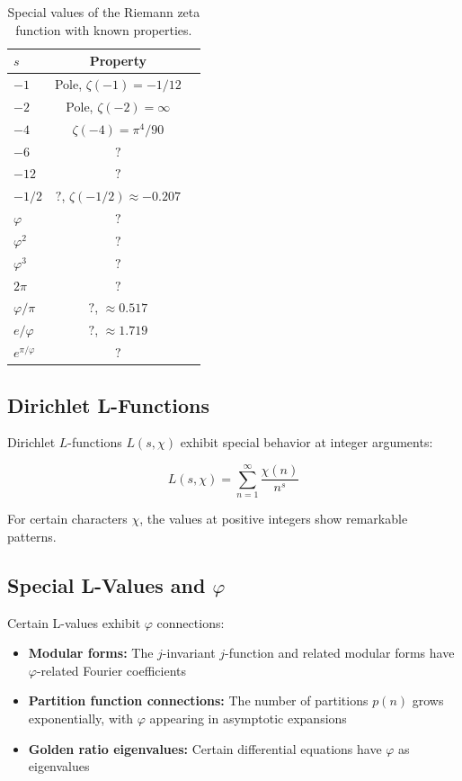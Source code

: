 \documentclass{article}
\begin{document}
\begin{table}[h]
\centering
\caption{Special values of the Riemann zeta function with known properties.}
\label{tab:zeta-special}
\renewcommand{\arraystretch}{1.1}
\begin{tabular}{lcc}
\toprule
$s$ & Property \\
\midrule
$-1$ & Pole, $\zeta(-1) = -1/12$ \\
$-2$ & Pole, $\zeta(-2) = \infty$ \\
$-4$ & $\zeta(-4) = \pi^4/90$ \\
$-6$ & $?$ \\
$-12$ & $?$ \\
$-1/2$ & $?$, $\zeta(-1/2) \approx -0.207$ \\
$\varphi$ & $?$ \\
$\varphi^2$ & $?$ \\
$\varphi^3$ & $?$ \\
$2\pi$ & $?$ \\
$\varphi/\pi$ & $?$, $\approx 0.517$ \\
$e/\varphi$ & $?$, $\approx 1.719$ \\
$e^{\pi/\varphi}$ & $?$ \\
\bottomrule
\end{tabular}

\subsection{Dirichlet L-Functions}

Dirichlet $L$-functions $L(s, \chi)$ exhibit special behavior at integer arguments:

\begin{equation}
  L(s, \chi) = \sum_{n=1}^\infty \frac{\chi(n)}{n^s}
  \label{eq:dirichlet}
\end{equation}

For certain characters $\chi$, the values at positive integers show remarkable patterns.

\subsection{Special L-Values and $\varphi$}

Certain L-values exhibit $\varphi$ connections:

\begin{itemize}
  \item \textbf{Modular forms:} The $j$-invariant $j$-function and related modular forms have $\varphi$-related Fourier coefficients
  \item \textbf{Partition function connections:} The number of partitions $p(n)$ grows exponentially, with $\varphi$ appearing in asymptotic expansions
  \item \textbf{Golden ratio eigenvalues:} Certain differential equations have $\varphi$ as eigenvalues
\end{itemize}


\end{table}
\end{document}
